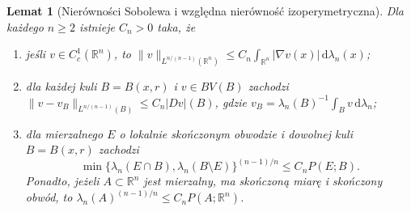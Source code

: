\documentclass[11pt,a4paper,oneside]{book}
\numberwithin{equation}{chapter}
\theoremstyle{plain}
\newtheorem{lemat}[twierdzenie]{Lemat}
\theoremstyle{definition}
\theoremstyle{remark}
\begin{document}
\begin{lemat}[Nierówności Sobolewa i względna nierówność izoperymetryczna]
\label{lem:dg-relative-isoperimetric}
Dla każdego $n\ge2$ istnieje $C_n>0$ taka, że
\begin{enumerate}[label=(\roman*)]
\item jeśli $v\in C_c^1(\mathbb R^n)$, to
 $\|v\|_{L^{n/(n-1)}(\mathbb R^n)}\le
 C_n\int_{\mathbb R^n}|\nabla v(x)|\,\mathrm d\lambda_n(x)$;
\item dla każdej kuli $B=B(x,r)$ i $v\in BV(B)$ zachodzi
 $\|v-v_B\|_{L^{n/(n-1)}(B)}\le C_n|Dv|(B)$,
 gdzie $v_B=\lambda_n(B)^{-1}\int_Bv\,\mathrm d\lambda_n$;
\item dla mierzalnego $E$ o lokalnie skończonym obwodzie
 i dowolnej kuli $B=B(x,r)$ zachodzi
 \[
 \min\{\lambda_n(E\cap B),\lambda_n(B\setminus E)\}^{(n-1)/n}
 \le C_n P(E;B).
 \]
 Ponadto, jeżeli $A\subset\mathbb R^n$ jest mierzalny,
 ma skończoną miarę i skończony obwód, to
 $\lambda_n(A)^{(n-1)/n}\le C_nP(A;\mathbb R^n)$.
\end{enumerate}
\end{lemat}
\end{document}
